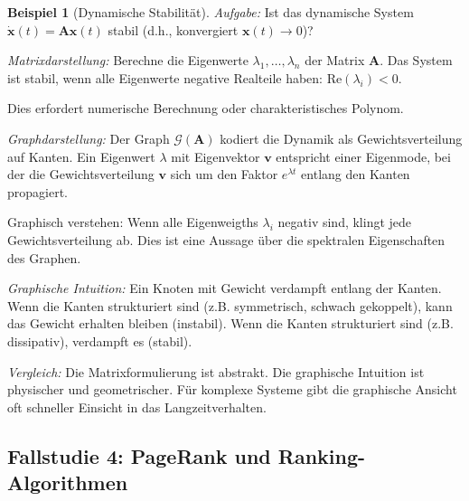 \documentclass[12pt, a4paper]{article}
\theoremstyle{definition}
\newtheorem{example}[theorem]{Beispiel}
\theoremstyle{remark}
\newcommand{\vA}{\bm{A}}
\newcommand{\Graph}{\mathcal{G}}
\begin{document}
\begin{example}[Dynamische Stabilität]
\label{ex:dynamische_stabilitaet}
\emph{Aufgabe:} Ist das dynamische System $\dot{\mathbf{x}}(t) = \vA \mathbf{x}(t)$ stabil (d.h., konvergiert $\mathbf{x}(t) \to 0$)?

\emph{Matrixdarstellung:}
Berechne die Eigenwerte $\lambda_1, \ldots, \lambda_n$ der Matrix $\vA$. Das System ist stabil, wenn alle Eigenwerte negative Realteile haben: $\text{Re}(\lambda_i) < 0$.

Dies erfordert numerische Berechnung oder charakteristisches Polynom.

\emph{Graphdarstellung:}
Der Graph $\Graph(\vA)$ kodiert die Dynamik als Gewichtsverteilung auf Kanten. Ein Eigenwert $\lambda$ mit Eigenvektor $\mathbf{v}$ entspricht einer Eigenmode, bei der die Gewichtsverteilung $\mathbf{v}$ sich um den Faktor $e^{\lambda t}$ entlang den Kanten propagiert.

Graphisch verstehen: Wenn alle Eigenweigths $\lambda_i$ negativ sind, klingt jede Gewichtsverteilung ab. Dies ist eine Aussage über die spektralen Eigenschaften des Graphen.

\emph{Graphische Intuition:}
Ein Knoten mit Gewicht verdampft entlang der Kanten. Wenn die Kanten strukturiert sind (z.B. symmetrisch, schwach gekoppelt), kann das Gewicht erhalten bleiben (instabil). Wenn die Kanten strukturiert sind (z.B. dissipativ), verdampft es (stabil).

\emph{Vergleich:}
Die Matrixformulierung ist abstrakt. Die graphische Intuition ist physischer und geometrischer. Für komplexe Systeme gibt die graphische Ansicht oft schneller Einsicht in das Langzeitverhalten.
\end{example}

\subsection{Fallstudie 4: PageRank und Ranking-Algorithmen}
\label{subsec:fallstudie_pagerank}
\end{document}
